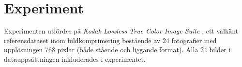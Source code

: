 



\section*{Experiment }

Experimenten utfördes på \textit{Kodak Lossless True Color Image Suite} \cite{franzen1999kodak},
ett välkänt referensdataset inom bildkomprimering bestående av 24 fotografier
med upplösningen 768 pixlar (både stående och liggande format).
Alla 24 bilder i datauppsättningen inkluderades i experimentet.

